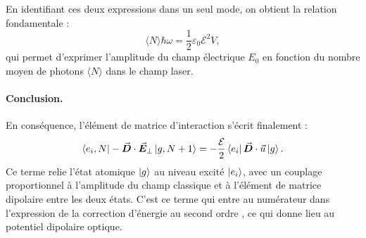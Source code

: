 En identifiant ces deux expressions dans un seul mode, on obtient la relation fondamentale :
\[
\langle N \rangle \hbar \omega = \frac{1}{2} \varepsilon_0 \mathcal{E}^2 V,
\]
qui permet d’exprimer l’amplitude du champ électrique \( E_0 \) en fonction du nombre moyen de photons \( \langle N \rangle \) dans le champ laser.



\paragraph{Conclusion.} En conséquence, l’élément de matrice d’interaction s’écrit finalement :
\[
\bra{e_i, N} - \vec{{\bm{D}}} \cdot \vec{{\bm{E}}}_\perp \ket{g, N + 1} = - \frac{\mathcal{E}}{2} \bra{e_i} \vec{{\bm{D}}} \cdot \vec{u} \ket{g}.
\]
Ce terme relie l’état atomique \( \ket{g} \) au niveau excité \( \ket{e_i} \), avec un couplage proportionnel à l’amplitude du champ classique et à l’élément de matrice dipolaire entre les deux états. C’est ce terme qui entre au numérateur dans l’expression de la correction d’énergie au second ordre , ce qui donne lieu au potentiel dipolaire optique.\\

